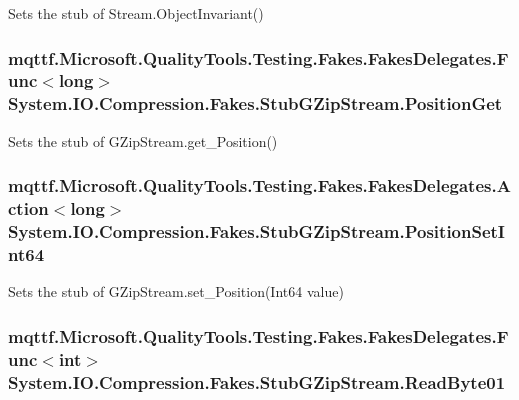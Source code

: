 Sets the stub of Stream.\-Object\-Invariant()

\hypertarget{class_system_1_1_i_o_1_1_compression_1_1_fakes_1_1_stub_g_zip_stream_aa9e7a98e5f46e00297c720aded0a919a}{
\subsubsection[{Position\-Get}]{\setlength{\rightskip}{0pt plus 5cm}mqttf.\-Microsoft.\-Quality\-Tools.\-Testing.\-Fakes.\-Fakes\-Delegates.\-Func$<$long$>$ System.\-I\-O.\-Compression.\-Fakes.\-Stub\-G\-Zip\-Stream.\-Position\-Get}}\label{class_system_1_1_i_o_1_1_compression_1_1_fakes_1_1_stub_g_zip_stream_aa9e7a98e5f46e00297c720aded0a919a}


Sets the stub of G\-Zip\-Stream.\-get\-\_\-\-Position()

\hypertarget{class_system_1_1_i_o_1_1_compression_1_1_fakes_1_1_stub_g_zip_stream_a4311b2ef50485c3f8185dc998ee04986}{
\subsubsection[{Position\-Set\-Int64}]{\setlength{\rightskip}{0pt plus 5cm}mqttf.\-Microsoft.\-Quality\-Tools.\-Testing.\-Fakes.\-Fakes\-Delegates.\-Action$<$long$>$ System.\-I\-O.\-Compression.\-Fakes.\-Stub\-G\-Zip\-Stream.\-Position\-Set\-Int64}}\label{class_system_1_1_i_o_1_1_compression_1_1_fakes_1_1_stub_g_zip_stream_a4311b2ef50485c3f8185dc998ee04986}


Sets the stub of G\-Zip\-Stream.\-set\-\_\-\-Position(\-Int64 value)

\hypertarget{class_system_1_1_i_o_1_1_compression_1_1_fakes_1_1_stub_g_zip_stream_a43cbd7617528127c7de774fefec33863}{
\subsubsection[{Read\-Byte01}]{\setlength{\rightskip}{0pt plus 5cm}mqttf.\-Microsoft.\-Quality\-Tools.\-Testing.\-Fakes.\-Fakes\-Delegates.\-Func$<$int$>$ System.\-I\-O.\-Compression.\-Fakes.\-Stub\-G\-Zip\-Stream.\-Read\-Byte01}}\label{class_system_1_1_i_o_1_1_compression_1_1_fakes_1_1_stub_g_zip_stream_a43cbd7617528127c7de774fefec33863}


